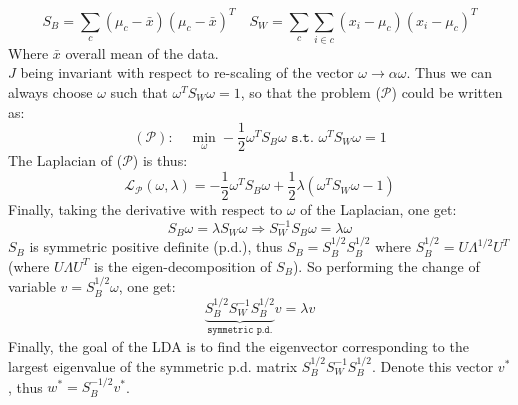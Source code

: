 \documentclass[11pt,a4paper,oneside]{article}
\begin{document}
\begin{equation}
S_B = \sum_c (\mu_c - \bar{x})(\mu_c - \bar{x})^T \quad S_W = \sum_c \sum_{i\in c} (x_i - \mu_c)(x_i - \mu_c)^T
\end{equation}
Where $\bar{x}$ overall mean of the data.\\
$J$ being invariant with respect to re-scaling of the vector $\omega \rightarrow \alpha \omega$. Thus we can always choose $\omega$ such that $\omega^T S_W \omega=1$, so that the problem ($\mathcal{P}$) could be written as:
\begin{equation}
(\mathcal{P}):\quad \min_{\omega} -\frac{1}{2} \omega^T S_B \omega \texttt{ s.t. } \omega^T S_W \omega =1
\end{equation}
The Laplacian of ($\mathcal{P}$) is thus:
\begin{equation}
\mathcal{L}_{\mathcal{P}}(\omega,\lambda) =  -\frac{1}{2} \omega^T S_B \omega + \frac{1}{2} \lambda (\omega^T S_W \omega-1)
\end{equation}
Finally, taking the derivative with respect to $\omega$ of the Laplacian, one get:
\begin{equation}
S_B \omega = \lambda S_W \omega \Rightarrow S_W^{-1} S_B \omega = \lambda \omega
\end{equation}
$S_B$ is symmetric positive definite (p.d.), thus $S_B = S_B^{1/2}S_B^{1/2}$ where $S_B^{1/2} = U \Lambda^{1/2} U^T$ (where $U \Lambda U^T$ is the eigen-decomposition of $S_B$). So performing the change of variable $v=S_B^{1/2} \omega$, one get:
\begin{equation}
\underbrace{S_B^{1/2} S_W^{-1} S_B^{1/2}}_{\texttt{symmetric p.d.}} v = \lambda v
\label{eigen}
\end{equation}
Finally, the goal of the LDA is to find the eigenvector corresponding to the largest eigenvalue of the symmetric p.d. matrix $S_B^{1/2} S_W^{-1} S_B^{1/2}$. Denote this vector $v^*$, thus $w^* = S_B^{-1/2}v^*$.
\end{document}
